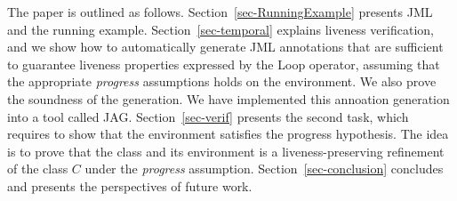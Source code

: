 The paper is outlined as follows. Section~\ref{sec-RunningExample} 
presents JML and the running example.
Section~\ref{sec-temporal} explains liveness verification, 
and we show how to automatically generate JML annotations that are 
sufficient to guarantee liveness properties expressed by the
\textsf{Loop} operator,%
assuming that the appropriate \textit{progress} assumptions holds on the
environment. We also prove the soundness of the generation.
We have implemented this annoation generation into a tool called \textsf{JAG}.
Section~\ref{sec-verif} presents the second task,
which requires to show that the environment satisfies the progress hypothesis.
The idea is to prove that the class and 
its environment is a liveness-preserving refinement of
the class \(C\) under the \textit{progress} assumption.  %
Section~\ref{sec-conclusion} concludes and presents 
the perspectives of future work.



